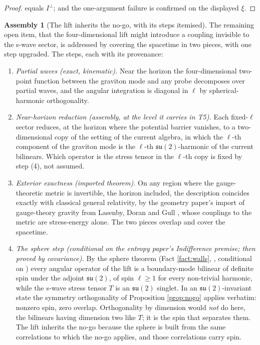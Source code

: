 \documentclass[11pt]{article}
\theoremstyle{definition}
\newtheorem{assembly}[theorem]{Assembly}
\begin{document}
\begin{proof}
equals $I^\perp$; and the one-argument failure is confirmed on the displayed $\xi$.
\end{proof}

\begin{assembly}[The lift inherits the no-go, with its steps itemised]\label{asm:lift}
The remaining open item, that the four-dimensional lift might introduce a coupling invisible to the s-wave sector, is addressed by covering the spacetime in two pieces, with one step upgraded. The steps, each with its provenance:
\begin{enumerate}
\item \emph{Partial waves (exact, kinematic).} Near the horizon the four-dimensional two-point function between the graviton mode and any probe decomposes over partial waves, and the angular integration is diagonal in $\ell$ by spherical-harmonic orthogonality.
\item \emph{Near-horizon reduction (assembly, at the level it carries in T5).} Each fixed-$\ell$ sector reduces, at the horizon where the potential barrier vanishes, to a two-dimensional copy of the setting of the current algebra, in which the $\ell$-th component of the graviton mode is the $\ell$-th $\mathfrak{su}(2)$-harmonic of the current bilinears. Which operator is the stress tensor in the $\ell$-th copy is fixed by step (4), not assumed.
\item \emph{Exterior exactness (imported theorem).} On any region where the gauge-theoretic metric is invertible, the horizon included, the description coincides exactly with classical general relativity, by the geometry paper's import of gauge-theory gravity from Lasenby, Doran and Gull \cite[Fact~2.1]{ButlerT6}, whose couplings to the metric are stress-energy alone. The two pieces overlap and cover the spacetime.
\item \emph{The sphere step (conditional on the entropy paper's Indifference premise; then proved by covariance).} By the sphere theorem (Fact \ref{fact:walls}, \cite[Thm.~5.5]{ButlerT8}, conditional on \cite[Principle~5.4]{ButlerT8}) every angular operator of the lift is a boundary-mode bilinear of definite spin under the adjoint $\mathfrak{su}(2)$, of spin $\ell \geq 1$ for every non-trivial harmonic, while the s-wave stress tensor $T$ is an $\mathfrak{su}(2)$ singlet. In an $\mathfrak{su}(2)$-invariant state the symmetry orthogonality of Proposition \ref{prop:nogo} applies verbatim: nonzero spin, zero overlap. Orthogonality by dimension would \emph{not} do here, the bilinears having dimension two like $T$; it is the spin that separates them. The lift inherits the no-go because the sphere is built from the same correlations to which the no-go applies, and those correlations carry spin.

\end{enumerate}
\end{assembly}
\end{document}

